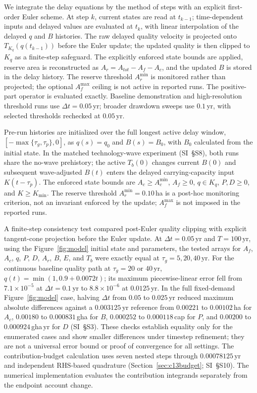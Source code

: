 \documentclass[preprint,12pt,authoryear]{elsarticle}
\newcommand{\Acmin}{A_c^{\min}}
\begin{document}
We integrate the delay equations by the method of steps with an explicit first-order Euler scheme. At step $k$, current states are read at $t_{k-1}$; time-dependent inputs and delayed values are evaluated at $t_k$, with linear interpolation of the delayed $q$ and $B$ histories. The raw delayed quality velocity is projected onto $T_{K_q}(q(t_{k-1}))$ before the Euler update; the updated quality is then clipped to $K_q$ as a finite-step safeguard. The explicitly enforced state bounds are applied, reserve area is reconstructed as $A_r=A_{tot}-A_f-A_c$, and the updated $B$ is stored in the delay history. The reserve threshold $A_r^{\min}$ is monitored rather than projected; the optional $A_f^{\max}$ ceiling is not active in reported runs. The positive-part operator is evaluated exactly. Baseline demonstration and high-resolution threshold runs use $\Delta t=0.05$\,yr; broader drawdown sweeps use $0.1$\,yr, with selected thresholds rechecked at $0.05$\,yr.

Pre-run histories are initialized over the full longest active delay window, $[-\max\{\tau_g,\tau_p\},0]$, as $q(s)=q_0$ and $B(s)=B_0$, with $B_0$ calculated from the initial state. In the matched technology-wave experiment (SI~\S S8), both runs share the no-wave prehistory; the active $T_b(0)$ changes current $B(0)$ and subsequent wave-adjusted $B(t)$ enters the delayed carrying-capacity input $K(t-\tau_p)$. The enforced state bounds are $A_c\ge\Acmin$, $A_f\ge0$, $q\in K_q$, $P,D\ge0$, and $K\ge K_{\min}$. The reserve threshold $A_r^{\min}=0.10$\,ha is a post-hoc monitoring criterion, not an invariant enforced by the update; $A_f^{\max}$ is not imposed in the reported runs.

A finite-step consistency test compared post-Euler quality clipping with explicit tangent-cone projection before the Euler update. At $\Delta t=0.05$\,yr and $T=100$\,yr, using the Figure~\ref{fig:model} initial state and parameters, the tested arrays for $A_f$, $A_c$, $q$, $P$, $D$, $A_r$, $B$, $E$, and $T_b$ were exactly equal at $\tau_g=5,20,40$\,yr. For the continuous baseline quality path at $\tau_g=20$ or $40$\,yr, $q(t)=\min(1,0.9+0.0072t)$; its maximum piecewise-linear error fell from $7.1\times10^{-5}$ at $\Delta t=0.1$\,yr to $8.8\times10^{-6}$ at $0.0125$\,yr. In the full fixed-demand Figure~\ref{fig:model} case, halving $\Delta t$ from $0.05$ to $0.025$\,yr reduced maximum absolute differences against a $0.003125$\,yr reference from $0.00221$ to $0.00102$\,ha for $A_c$, $0.00180$ to $0.000831$\,gha for $B$, $0.000252$ to $0.000118$\,cap for $P$, and $0.00200$ to $0.000924$\,gha\,yr for $D$ (SI~\S S3). These checks establish equality only for the enumerated cases and show smaller differences under timestep refinement; they are not a universal error bound or proof of convergence for all settings. The contribution-budget calculation uses seven nested steps through $0.00078125$\,yr and independent RHS-based quadrature (Section~\ref{sec:c13budget}; SI~\S S10). The numerical implementation evaluates the contribution integrands separately from the endpoint account change.
\end{document}
